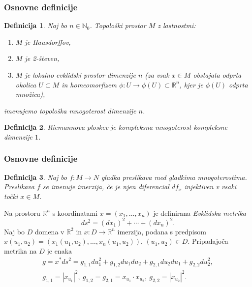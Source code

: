 \documentclass[9pt, table]{beamer}
\newtheorem{definicija}{Definicija}
\newcommand{\R}{\mathbb R}
\newcommand{\N}{\mathbb N}
\begin{document}

\begin{frame}
\frametitle{Osnovne definicije}

\begin{definicija}
Naj bo $n \in \N_{0}$. Topološki prostor $M$ z lastnostmi:
\begin{enumerate}
\item $M$ je Hausdorffov,
\item $M$ je 2-števen,
\item $M$ je lokalno evklidski prostor dimenzije $n$ (za vsak $x \in M$ obstajata odprta okolica $U \subset M$ in homeomorfizem $\phi \colon U \to \phi(U) \subset \R^{n}$, kjer je $\phi(U)$ odprta množica),
\end{enumerate}
imenujemo \textup{topološka mnogoterost} dimenzije $n$.
\end{definicija}

\pause
\begin{definicija}
\textup{Riemannova ploskev} je kompleksna mnogoterost kompleksne dimenzije $1$.
\end{definicija}

\end{frame}


\begin{frame}
\frametitle{Osnovne definicije}

\begin{definicija}
Naj bo $f \colon M \to N$ gladka preslikava med gladkima mnogoterostima. Preslikava $f$ se imenuje \textup{imerzija}, če je njen diferencial $df_{x}$ injektiven v vsaki točki $x \in M$.
\end{definicija}

\pause
Na prostoru $\R^{n}$ s koordinatami $x = (x_{1}, \dots, x_{n})$ je definirana \emph{Evklidska metrika}
\begin{equation}
ds^2 = (dx_{1})^2 + \cdots + (dx_{n})^2.
\end{equation}
Naj bo $D$ domena v $\R^2$ in $x \colon D \to \R^{n}$ imerzija, podana s predpisom $x(u_1,u_2) = (x_{1}(u_1,u_2), \dots, x_{n}(u_1,u_2))$, $(u_1,u_2) \in D$. Pripadajoča metrika na $D$ je enaka
\begin{gather}
g = x^{*}ds^2 = g_{1,1}du_{1}^2 + g_{1,2}du_{1}du_{2} + g_{2,1}du_{2}du_{1} + g_{2,2}du_{2}^2, \\
g_{1,1} = |x_{u_1}|^2, \ g_{1,2} = g_{2,1} = x_{u_1} \cdot x_{u_2}, \ g_{2,2} = |x_{u_2}|^2.
\end{gather}

\end{frame}
\end{document}
